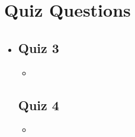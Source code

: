 \section{Quiz Questions}
\begin{itemize}
  \item[]

  \subsection{Quiz 3}
  \begin{itemize}
    \item
  \end{itemize}

  \subsection{Quiz 4}
  \begin{itemize}
    \item
  \end{itemize}

\end{itemize}

